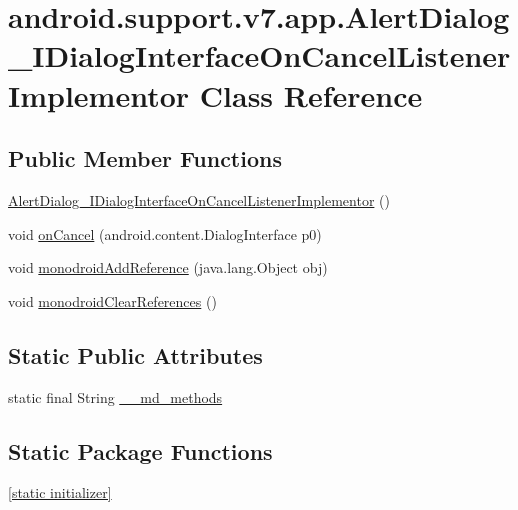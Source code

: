 \hypertarget{classandroid_1_1support_1_1v7_1_1app_1_1_alert_dialog___i_dialog_interface_on_cancel_listener_implementor}{
\section{android.support.v7.app.AlertDialog\_\-IDialogInterfaceOnCancelListenerImplementor Class Reference}
\label{classandroid_1_1support_1_1v7_1_1app_1_1_alert_dialog___i_dialog_interface_on_cancel_listener_implementor}
}
\subsection*{Public Member Functions}
\begin{CompactItemize}
\item 
\hyperlink{classandroid_1_1support_1_1v7_1_1app_1_1_alert_dialog___i_dialog_interface_on_cancel_listener_implementor_f5572df93ae67ee462dd68692aa7ac92}{AlertDialog\_\-IDialogInterfaceOnCancelListenerImplementor} ()
\item 
void \hyperlink{classandroid_1_1support_1_1v7_1_1app_1_1_alert_dialog___i_dialog_interface_on_cancel_listener_implementor_e2ec072b3df6d4e38f2537cf8b7a4978}{onCancel} (android.content.DialogInterface p0)
\item 
void \hyperlink{classandroid_1_1support_1_1v7_1_1app_1_1_alert_dialog___i_dialog_interface_on_cancel_listener_implementor_3d21bf61ee97426dcae3644ed4fe5be4}{monodroidAddReference} (java.lang.Object obj)
\item 
void \hyperlink{classandroid_1_1support_1_1v7_1_1app_1_1_alert_dialog___i_dialog_interface_on_cancel_listener_implementor_090abc2cc0327da238bc171c57f28c56}{monodroidClearReferences} ()
\end{CompactItemize}
\subsection*{Static Public Attributes}
\begin{CompactItemize}
\item 
static final String \hyperlink{classandroid_1_1support_1_1v7_1_1app_1_1_alert_dialog___i_dialog_interface_on_cancel_listener_implementor_ad0667e101becd304b276b6492f459d1}{\_\-\_\-md\_\-methods}
\end{CompactItemize}
\subsection*{Static Package Functions}
\begin{CompactItemize}
\item 
\hyperlink{classandroid_1_1support_1_1v7_1_1app_1_1_alert_dialog___i_dialog_interface_on_cancel_listener_implementor_d21763e2c085673937384d78a3cfacb8}{\mbox{[}static initializer\mbox{]}}
\end{CompactItemize}

